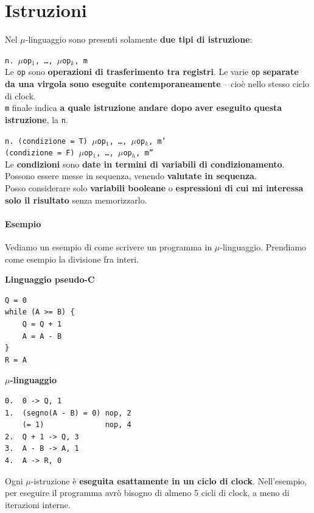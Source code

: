 \documentclass[10pt]{report}
\begin{document}
\section{Istruzioni}
Nel $\mu$-linguaggio sono presenti solamente \textbf{due tipi di istruzione}:
\begin{list}{}{}
	\item \texttt{n. $\mu$op$_1$, \ldots, $\mu$op$_k$, m}\\
	Le \texttt{op} sono \textbf{operazioni di trasferimento tra registri}. Le varie \texttt{op} \textbf{separate da una virgola sono eseguite contemporaneamente} -- cioè nello stesso ciclo di clock.\\
	\texttt{m} finale indica \textbf{a quale istruzione andare dopo aver eseguito questa istruzione}, la \texttt{n}.
	\item \texttt{n. (condizione = T) $\mu$op$_1$, \ldots, $\mu$op$_k$, m'\\
	(condizione = F) $\mu$op$_1$, \ldots, $\mu$op$_h$, m''}\\
	Le \textbf{condizioni} sono \textbf{date in termini di variabili di condizionamento}. Possono essere messe in sequenza, venendo \textbf{valutate in sequenza}.\\
	Posso considerare solo \textbf{variabili booleane} o \textbf{espressioni di cui mi interessa solo il risultato} senza memorizzarlo.
\end{list}
\paragraph{Esempio} Vediamo un esempio di come scrivere un programma in $\mu$-linguaggio. Prendiamo come esempio la divisione fra interi.\\
\begin{multicols}{2}
\begin{center}
\textbf{Linguaggio pseudo-C}
\begin{verbatim}
Q = 0
while (A >= B) {
    Q = Q + 1
    A = A - B
}
R = A
\end{verbatim}
\end{center}
\columnbreak
\begin{center}
\textbf{$\mu$-linguaggio}
\begin{verbatim}
0.  0 -> Q, 1
1.  (segno(A - B) = 0) nop, 2
    (= 1)              nop, 4
2.  Q + 1 -> Q, 3
3.  A - B -> A, 1
4.  A -> R, 0
\end{verbatim}
\end{center}
\end{multicols}
Ogni $\mu$-istruzione è \textbf{eseguita esattamente in un ciclo di clock}. Nell'esempio, per eseguire il programma avrò bisogno di almeno 5 cicli di clock, a meno di iterazioni interne.
\pagebreak
\end{document}
